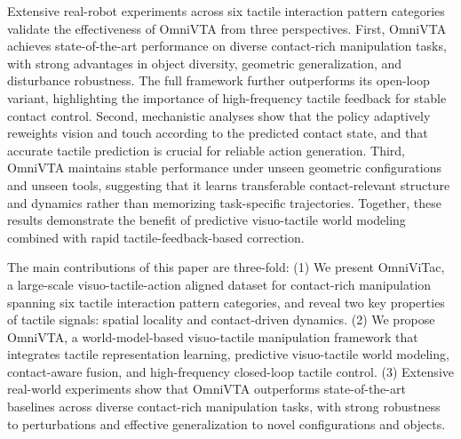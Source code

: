 Extensive real-robot experiments across six tactile interaction pattern categories validate the effectiveness of OmniVTA from three perspectives. First, OmniVTA achieves state-of-the-art performance on diverse contact-rich manipulation tasks, with strong advantages in object diversity, geometric generalization, and disturbance robustness. The full framework further outperforms its open-loop variant, highlighting the importance of high-frequency tactile feedback for stable contact control. Second, mechanistic analyses show that the policy adaptively reweights vision and touch according to the predicted contact state, and that accurate tactile prediction is crucial for reliable action generation. Third, OmniVTA maintains stable performance under unseen geometric configurations and unseen tools, suggesting that it learns transferable contact-relevant structure and dynamics rather than memorizing task-specific trajectories. Together, these results demonstrate the benefit of predictive visuo-tactile world modeling combined with rapid tactile-feedback-based correction.

The main contributions of this paper are three-fold:
(1) We present OmniViTac, a large-scale visuo-tactile-action aligned dataset for contact-rich manipulation spanning six tactile interaction pattern categories, and reveal two key properties of tactile signals: spatial locality and contact-driven dynamics.
(2) We propose OmniVTA, a world-model-based visuo-tactile manipulation framework that integrates tactile representation learning, predictive visuo-tactile world modeling, contact-aware fusion, and high-frequency closed-loop tactile control.
(3) Extensive real-world experiments show that OmniVTA outperforms state-of-the-art baselines across diverse contact-rich manipulation tasks, with strong robustness to perturbations and effective generalization to novel configurations and objects.